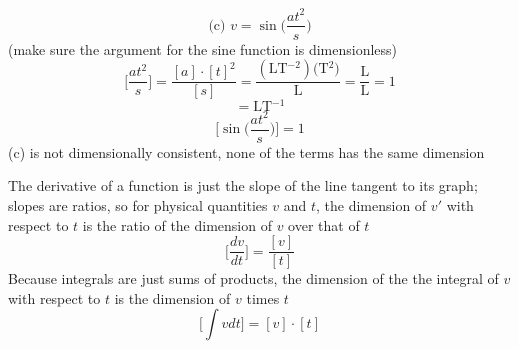 \documentclass[a4paper]{article}
\begin{document}
    \begin{equation}
        \text{(c) } v = \sin\bigg(\frac{at^2}{s}\bigg)
    \end{equation}
    (make sure the argument for the sine function is dimensionless)
    \begin{equation}
        \bigg[\frac{at^2}{s}\bigg] = \frac{[a] \cdot [t]^2}{[s]} = \frac{(\text{LT$^{-2}$}) \text{(T$^2$)}}{\text{L}} = \frac{\text{L}}{\text{L}} = 1
    \end{equation}
    \begin{equation}
        [v] = \text{LT$^{-1}$}
    \end{equation}
    \begin{equation}
        \bigg[\sin\bigg(\frac{at^2}{s}\bigg)\bigg] = 1
    \end{equation}
    (c) is not dimensionally consistent, none of the terms has the same dimension

    The derivative of a function is just the slope of the line tangent to its graph; slopes are ratios, so for physical quantities $v$ and $t$, the dimension of $v'$ with respect to $t$ is the ratio of the dimension of $v$ over that of $t$
    \begin{equation}
        \bigg[\frac{dv}{dt}\bigg] = \frac{[v]}{[t]}
    \end{equation}
    Because integrals are just sums of products, the dimension of the the integral of $v$ with respect to $t$ is the dimension of $v$ times $t$
    \begin{equation}
        \bigg[\int vdt\bigg] = [v] \cdot [t]
    \end{equation}
\end{document}
